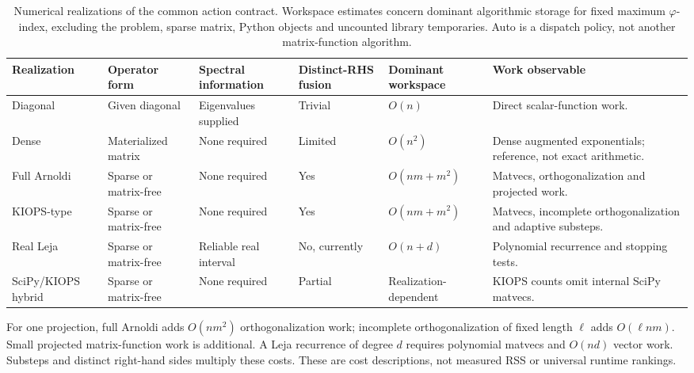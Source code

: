 \begin{table}[!htbp]
\centering\small
\caption{Numerical realizations of the common action contract. Workspace estimates concern dominant algorithmic storage for fixed maximum $\varphi$-index, excluding the problem, sparse matrix, Python objects and uncounted library temporaries. Auto is a dispatch policy, not another matrix-function algorithm.}\label{tab:backends}
\begin{tabularx}{\linewidth}{@{}p{2.05cm}X X p{1.35cm}p{2.05cm}X@{}}\toprule
Realization & Operator form & Spectral information & Distinct-RHS fusion & Dominant workspace & Work observable\\\midrule
Diagonal & Given diagonal & Eigenvalues supplied & Trivial & $O(n)$ & Direct scalar-function work.\\\addlinespace
Dense & Materialized matrix & None required & Limited & $O(n^2)$ & Dense augmented exponentials; reference, not exact arithmetic.\\\addlinespace
Full Arnoldi & Sparse or matrix-free & None required & Yes & $O(nm+m^2)$ & Matvecs, orthogonalization and projected work.\\\addlinespace
KIOPS-type & Sparse or matrix-free & None required & Yes & $O(nm+m^2)$ & Matvecs, incomplete orthogonalization and adaptive substeps.\\\addlinespace
Real Leja & Sparse or matrix-free & Reliable real interval & No, currently & $O(n+d)$ & Polynomial recurrence and stopping tests.\\\addlinespace
SciPy/\allowbreak KIOPS hybrid & Sparse or matrix-free & None required & Partial & Realization-dependent & KIOPS counts omit internal SciPy matvecs.\\\bottomrule
\end{tabularx}
\par\smallskip\footnotesize
For one projection, full Arnoldi adds $O(nm^2)$ orthogonalization work; incomplete orthogonalization of fixed length $\ell$ adds $O(\ell nm)$. Small projected matrix-function work is additional. A Leja recurrence of degree $d$ requires polynomial matvecs and $O(nd)$ vector work. Substeps and distinct right-hand sides multiply these costs. These are cost descriptions, not measured RSS or universal runtime rankings.
\end{table}
